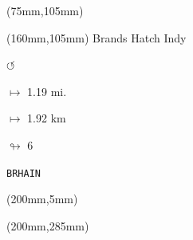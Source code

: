 \begin{textblock*}{80mm}(75mm,105mm)%
\end{textblock*}
\begin{textblock*}{40mm}(160mm,105mm)%
Brands Hatch Indy
\par \Huge$\circlearrowleft$
\Large
\par$\mapsto$ 1.19 mi.
\par$\mapsto$ 1.92 km
\par$\looparrowright$ 6
\par\hfill\tiny\tt BRHAIN\\
\end{textblock*}
\begin{textblock*}{20mm}(200mm,5mm)%
\fbox{\thepage}
\end{textblock*}
\begin{textblock*}{20mm}(200mm,285mm)%
\fbox{\thepage}
\end{textblock*}
\null\newpage

